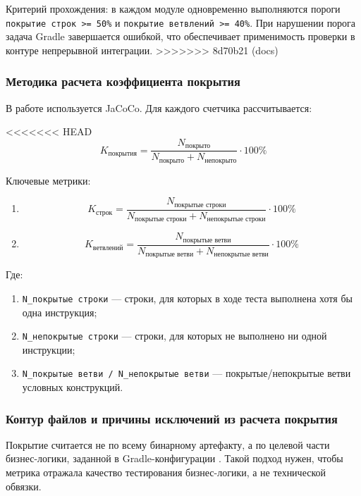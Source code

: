 Критерий прохождения: в каждом модуле одновременно выполняются пороги \texttt{покрытие строк >= 50\%} и \texttt{покрытие ветвлений >= 40\%}. При нарушении порога задача Gradle завершается ошибкой, что обеспечивает применимость проверки в контуре непрерывной интеграции.
>>>>>>> 8d70b21 (docs)

\subsubsection{Методика расчета коэффициента покрытия}

В работе используется JaCoCo. Для каждого счетчика рассчитывается:

<<<<<<< HEAD
\[
K_{\text{покрытия}}=\frac{N_{\text{покрыто}}}{N_{\text{покрыто}}+N_{\text{непокрыто}}}\cdot 100\%
\]

Ключевые метрики:
\begin{enumerate}
    \item \[
    K_{\text{строк}}=\frac{N_{\text{покрытые строки}}}{N_{\text{покрытые строки}}+N_{\text{непокрытые строки}}}\cdot 100\%
    \]
    \item \[
    K_{\text{ветвлений}}=\frac{N_{\text{покрытые ветви}}}{N_{\text{покрытые ветви}}+N_{\text{непокрытые ветви}}}\cdot 100\%
    \]
\end{enumerate}

Где:
\begin{enumerate}
    \item \texttt{N\_покрытые строки} --- строки, для которых в ходе теста выполнена хотя бы одна инструкция;
    \item \texttt{N\_непокрытые строки} --- строки, для которых не выполнено ни одной инструкции;
    \item \texttt{N\_покрытые ветви / N\_непокрытые ветви} --- покрытые/непокрытые ветви условных конструкций.
\end{enumerate}

\subsubsection{Контур файлов и причины исключений из расчета покрытия}

Покрытие считается не по всему бинарному артефакту, а по целевой части бизнес-логики, заданной в Gradle-конфигурации . Такой подход нужен, чтобы метрика отражала качество тестирования бизнес-логики, а не технической обвязки.

